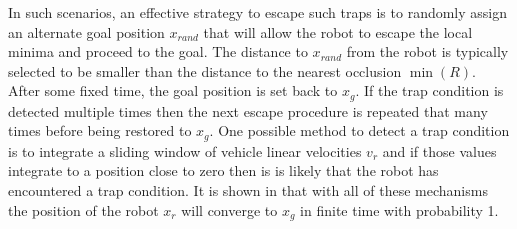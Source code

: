 In such scenarios, an effective strategy to escape such traps is to randomly assign an alternate goal position $x_{rand}$
that will allow the robot to escape the local minima and proceed to the goal. The distance to $x_{rand}$ from the robot
is typically selected to be smaller than the distance to the nearest occlusion $\min(R)$. After some fixed time, the
goal position is set back to $x_g$. If the trap condition is detected multiple times then the next escape procedure is
repeated that many times before being restored to $x_g$. One possible method to detect a trap condition is to integrate
a sliding window of vehicle linear velocities $v_r$ and if those values integrate to a position close to zero then is is likely
that the robot has encountered a trap condition. It is shown in \cite{Krishnamurthy07} that with all of these mechanisms the position of the robot 
$x_r$ will converge to $x_g$ in finite time with probability 1.